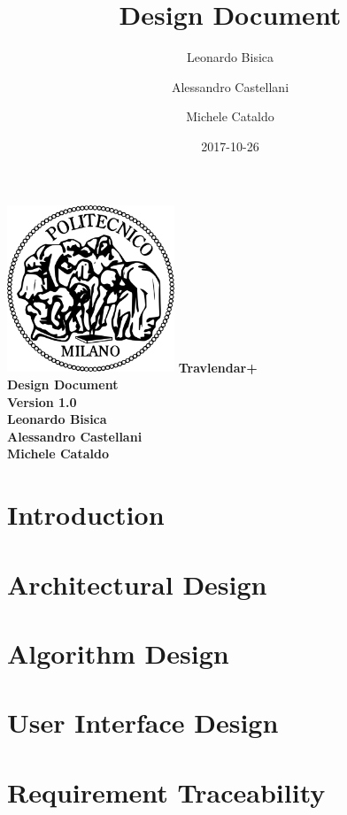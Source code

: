\documentclass[12pt, a4paper]{article}
\title{Design Document}
\date{2017-10-26}
\author{
	Leonardo Bisica
	\and
	Alessandro Castellani
	\and
	Michele Cataldo
}
\begin{document}
	\begin{titlepage}
		\centering
		\includegraphics[width=5cm]{img/polimi_logo}
		\vfill
		{\bfseries\Large
			Travlendar+\\
			Design Document\\
			Version 1.0\\
			\vskip4cm
			Leonardo Bisica\\
			Alessandro Castellani\\
			Michele Cataldo\\
		}
		\vfill
		\vfill
	\end{titlepage}

	\tableofcontents
	
	
	
	\newpage
	\section{Introduction}
		
		

	\newpage
	\section{Architectural Design}
		
		
	\newpage
	\section{Algorithm Design}
		

	\newpage
	\section{User Interface Design}
		
		
	\newpage
	\section{Requirement Traceability}
\end{document}
